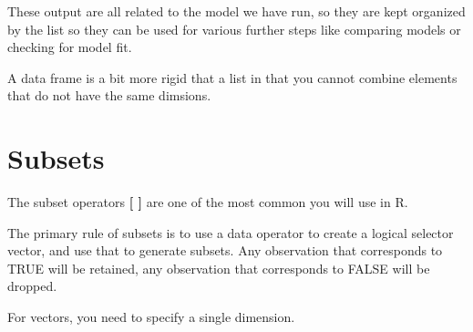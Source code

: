 \documentclass[]{book}
\newenvironment{Shaded}{\begin{snugshade}}{\end{snugshade}}
\newcommand{\CommentTok}[1]{\textcolor[rgb]{0.56,0.35,0.01}{\textit{#1}}}
\theoremstyle{definition}
\theoremstyle{definition}
\theoremstyle{definition}
\theoremstyle{remark}
\begin{document}
These output are all related to the model we have run, so they are kept
organized by the list so they can be used for various further steps like
comparing models or checking for model fit.

A data frame is a bit more rigid that a list in that you cannot combine
elements that do not have the same dimsions.

\begin{Shaded}
\end{Shaded}

\hypertarget{subsets}{%
\section{Subsets}\label{subsets}}

The subset operators \textbf{{[} {]}} are one of the most common you
will use in R.

The primary rule of subsets is to use a data operator to create a
logical selector vector, and use that to generate subsets. Any
observation that corresponds to TRUE will be retained, any observation
that corresponds to FALSE will be dropped.

For vectors, you need to specify a single dimension.
\end{document}
